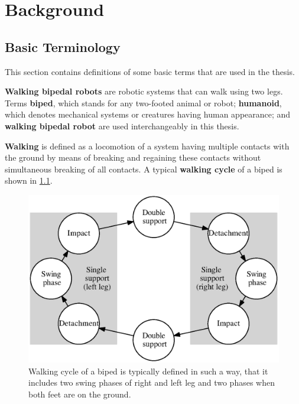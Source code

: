 \chapter{Background}
\label{ch.background}

\section{Basic Terminology}
This section contains definitions of some basic terms that are used in the thesis.

{\bf Walking bipedal robots} are robotic systems that can walk using two legs. 
Terms {\bf biped}, which stands for any two-footed animal or robot; {\bf humanoid},
which denotes mechanical systems or creatures having human appearance; and {\bf walking 
bipedal robot} are used interchangeably in this thesis. 

{\bf Walking} is defined as a locomotion of a system having multiple contacts with the 
ground by means of breaking and regaining these contacts without simultaneous breaking 
of all contacts. A typical {\bf walking cycle} of a biped is shown in \cref{fig.walkcycle}.

\begin{figure}[ht]
    \centerline{%
    \includegraphics[scale=0.45]{Figures/walk_cycle.eps}}
    \caption[Walking cycle of a biped]{Walking cycle of a biped is typically defined in
    such a way, that it includes two swing phases of right and left leg and two phases 
    when both feet are on the ground.}
    \label{fig.walkcycle}
\end{figure}

